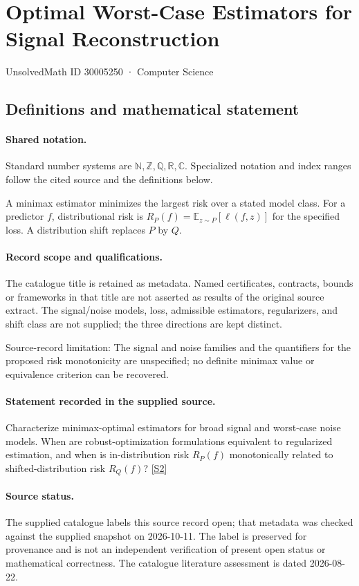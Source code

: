 \documentclass[11pt]{article}
\newcommand{\sref}[2]{\hyperlink{source:#1:#2}{[S#2]}}
\begin{document}
\setcounter{section}{30005249}
\section{Optimal Worst-Case Estimators for Signal Reconstruction}\label{30005250}
{\small\sffamily UnsolvedMath ID 30005250 · Computer Science}
\subsection{Definitions and mathematical statement}

\paragraph{Shared notation.}Standard number systems are $\mathbb N,\mathbb Z,\mathbb Q,\mathbb R,\mathbb C$. Specialized notation and index ranges follow the cited source and the definitions below.


A minimax estimator minimizes the largest risk over a stated model class. For a predictor $f$, distributional risk is $R_P(f)=\mathbb E_{z\sim P}[\ell(f,z)]$ for the specified loss. A distribution shift replaces $P$ by $Q$.
\paragraph{Record scope and qualifications.}
The catalogue title is retained as metadata. Named certificates, contracts, bounds or frameworks in that title are not asserted as results of the original source extract.
The signal/noise models, loss, admissible estimators, regularizers, and shift class are not supplied; the three directions are kept distinct.

Source-record limitation: The signal and noise families and the quantifiers for the proposed risk monotonicity are unspecified; no definite minimax value or equivalence criterion can be recovered.
\paragraph{Statement recorded in the supplied source.}
Characterize minimax-optimal estimators for broad signal and worst-case noise models. When are robust-optimization formulations equivalent to regularized estimation, and when is in-distribution risk $R_P(f)$ monotonically related to shifted-distribution risk $R_Q(f)$? \sref{30005250}{2}
\paragraph{Source status.}
The supplied catalogue labels this source record open; that metadata was checked against the supplied snapshot on 2026-10-11. The label is preserved for provenance and is not an independent verification of present open status or mathematical correctness. The catalogue literature assessment is dated 2026-08-22.
\end{document}
